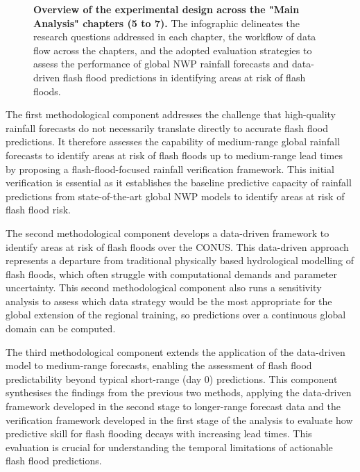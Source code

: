 \begin{figure}[htbp]
\caption{\textbf{Overview of the experimental design across the "Main Analysis" chapters (5 to 7).} The infographic delineates the research questions addressed in each chapter, the workflow of data flow across the chapters, and the adopted evaluation strategies to assess the performance of global NWP rainfall forecasts and data-driven flash flood predictions in identifying areas at risk of flash floods.}
\label{fig:workflow_dataflow}
\end{figure}

The  first methodological component addresses the challenge that high-quality rainfall forecasts do not necessarily translate directly to accurate flash flood predictions. It therefore assesses the capability of medium-range global rainfall forecasts to identify areas at risk of flash floods up to medium-range lead times by proposing a flash-flood-focused rainfall verification framework. This initial verification is essential as it establishes the baseline predictive capacity of rainfall predictions from state-of-the-art global NWP models to identify areas at risk of flash flood risk.

The  second methodological component develops a data-driven framework to identify areas at risk of flash floods over the CONUS. This data-driven approach represents a departure from traditional physically based hydrological modelling of flash floods, which often struggle with computational demands and parameter uncertainty. This second methodological component also runs a sensitivity analysis to assess which data strategy would be the most appropriate for the global extension of the regional training, so predictions over a continuous global domain can be computed.

The  third methodological component extends the application of the data-driven model to medium-range forecasts, enabling the assessment of flash flood predictability beyond typical short-range (day 0) predictions. This component synthesises the findings from the previous two methods, applying the data-driven framework developed in the second stage to longer-range forecast data and the verification framework developed in the first stage of the analysis to evaluate how predictive skill for flash flooding decays with increasing lead times. This evaluation is crucial for understanding the temporal limitations of actionable flash flood predictions.

